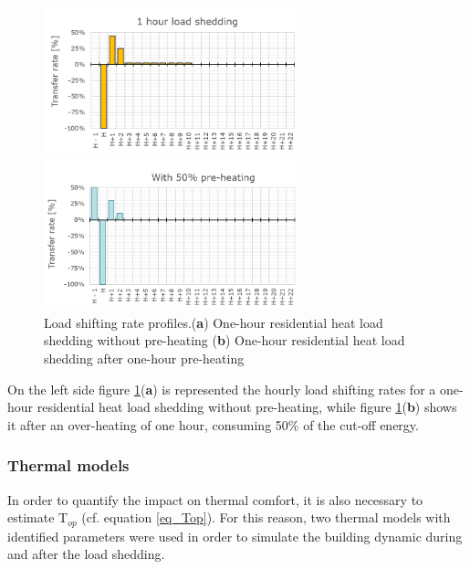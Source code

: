 \documentclass[buildings,article,submit,moreauthors,pdftex,10pt,a4paper]{mdpi}
\theoremstyle{mdpi}
\newcounter{ex}
\newcounter{re}
\theoremstyle{mdpidefinition}
\begin{document}
\begin{figure}[H]
	\centering
   	\begin{minipage}[c]{7.5cm}
      	\includegraphics[width=7.5cm, trim=30 0 0 33, clip=true]{Figure_1.png}
   \end{minipage} \hfill
   \begin{minipage}[c]{7.5cm}
        \includegraphics[width=7.5cm, trim=20 0 0 36, clip=true]{Figure_2.png}
   \end{minipage}
 
   \caption{Load shifting rate profiles.(\textbf{a}) One-hour residential heat load shedding without pre-heating (\textbf{b}) One-hour residential heat load shedding after one-hour pre-heating}
   \label{exp_lt_profile}
   
\end{figure}

On the left side figure \ref{exp_lt_profile}(\textbf{a}) is represented the hourly load shifting rates for a one-hour residential heat load shedding without pre-heating, while figure \ref{exp_lt_profile}(\textbf{b}) shows it after an over-heating of one hour, consuming 50\% of the cut-off energy.

\subsubsection{Thermal models}
\label{thermal_models}
In order to quantify the impact on thermal comfort, it is also necessary to estimate T$_{op}$ (cf. equation \ref{eq_Top}). For this reason, two thermal models with identified parameters were used in order to simulate the building dynamic during and after the load shedding. 
\end{document}

